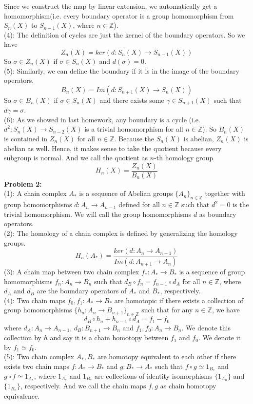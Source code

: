 \documentclass[12pt]{amsart}
\newcommand{\Z}{\mathbb{Z}}
\begin{document}
Since we construct the map by linear extension, we automatically get a homomorphism(i.e. every boundary operator is a group homomorphism from $S_n(X)$ to $S_{n-1}(X)$, where $n\in \Z$).\\
(4): The definition of cycles are just the kernel of the boundary operators. So we have 
\[Z_n(X)=ker(d:S_n(X)\to S_{n-1}(X))\]
So $\sigma\in Z_n(X)$ if $\sigma\in S_n(X)$ and $d(\sigma)=0$.\\
(5): Similarly, we can define the boundary if it is in the image of the boundary operators.
\[B_n(X)=Im(d:S_{n+1}(X)\to S_n(X))\]
So $\sigma\in B_n(X)$ if $\sigma\in S_n(X)$ and there exists some $\gamma\in S_{n+1}(X)$ such that $d\gamma=\sigma$.\\
(6): As we showed in last homework, any boundary is a cycle (i.e. $d^2:S_n(X)\to S_{n-2}(X)$ is a trivial homomorphism for all $n\in \Z$). So $B_n(X)$ is contained in $Z_n(X)$ for all $n\in\Z$. Because the $S_n(X)$ is abelian, $Z_n(X)$ is abelian as well. Hence, it makes sense to take the quotient because every subgroup is normal. And we call the quotient as $n$-th homology group
\[H_n(X)=\frac{Z_n(X)}{B_n(X)}\]
\textbf{Problem 2:}\\
(1): A chain complex $A_\ast$ is a sequence of Abelian groups $\{A_n\}_{n\in\Z}$ together with group homomorphisms $d:A_n\to A_{n-1}$ defined for all $n\in \Z$ such that $d^2=0$ is the trivial homomorphism. We will call the group homomorphisms $d$ as boundary operators.\\
(2): The homology of a chain complex is defined by generalizing the homology groups.
\[H_n(A_\ast)=\frac{ker(d:A_n\to A_{n-1})}{Im(d:A_{n+1}\to A_n)}\]
(3): A chain map between two chain complex $f_\ast: A_\ast\to B_\ast$ is a sequence of group homomorphisms $f_n:A_n\to B_n$ such that $d_B\circ f_n=f_{n-1}\circ d_A$ for all $n\in\Z$, where $d_A$ and $d_B$ are the boundary operators of $A_\ast$ and $B_\ast$, respectively.\\
(4): Two chain maps $f_0,f_1: A_\ast\to B_\ast$ are homotopic if there exists a collection of group homomorphisms $\{h_n:A_n\to B_{n+1}\}_{n\in\Z}$ such that for any $n\in\Z$, we have 
$$d_B\circ h_{n}+h_{n-1}\circ d_A=f_1-f_0$$
where $d_A: A_n\to A_{n-1}$, $d_B: B_{n+1}\to B_n$ and $f_1,f_0:A_n\to B_n$. We denote this collection by $h$ and say it is a chain homotopy between $f_1$ and $f_0$. We denote it by $f_1\simeq f_0$.\\
(5): Two chain complex $A_\ast,B_\ast$ are homotopy equivalent to each other if there exists two chain maps $f:A_\ast\to B_\ast$ and $g:B_\ast\to A_\ast$ such that $f\circ g\simeq 1_{B_\ast}$ and $g\circ f\simeq 1_{A_\ast}$, where $1_{A_\ast}$ and $1_{B_\ast}$ are collections of identity isomorphisms $\{1_{A_n}\}$ and $\{1_{B_n}\}$, respectively. And we call the chain maps $f,g$ as chain homotopy equivalence.\\
\end{document}

